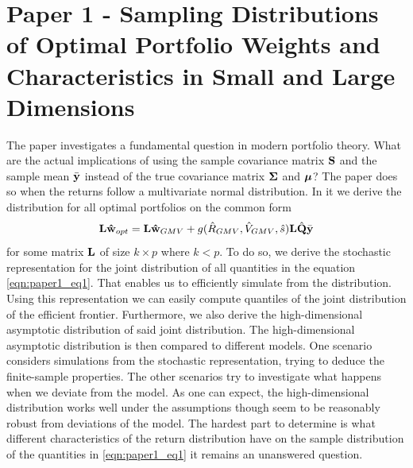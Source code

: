 \documentclass[oneside]{book}\usepackage{knitr}
\begin{document}
\section{Paper 1 - Sampling Distributions of Optimal Portfolio Weights and Characteristics in Small and Large Dimensions}\label{sec:paper1}
The paper investigates a fundamental question in modern portfolio theory. 
What are the actual implications of using the sample covariance matrix $\mathbf{S}$ and the sample mean $\bar{\mathbf{y}}$ instead of the true covariance matrix $\mathbf{\Sigma}$ and $\mbox{\boldmath$\mu$}$?
The paper does so when the returns follow a multivariate normal distribution. 
In it we derive the distribution for all optimal portfolios on the common form
\begin{equation}\label{eqn:paper1_eq1}
  \mathbf{L}\mathbf{\hat{w}}_{opt} = \mathbf{L}\mathbf{\hat{w}}_{GMV} + g(\hat{R}_{GMV}, \hat{V}_{GMV}, \hat{s})\mathbf{L}\hat{\mathbf{Q}}\bar{\mathbf{y}}
\end{equation}
for some matrix $\mathbf{L}$ of size $k \times p$ where $k<p$.
To do so, we derive the stochastic representation for the joint distribution of all quantities in the equation \eqref{eqn:paper1_eq1}. 
That enables us to efficiently simulate from the distribution.
Using this representation we can easily compute quantiles of the joint distribution of the efficient frontier.
Furthermore, we also derive the high-dimensional asymptotic distribution of said joint distribution. 
The high-dimensional asymptotic distribution is then compared to different models.
One scenario considers simulations from the stochastic representation, trying to deduce the finite-sample properties.
The other scenarios try to investigate what happens when we deviate from the model.
As one can expect, the high-dimensional distribution works well under the assumptions though seem to be reasonably robust from deviations of the model.
The hardest part to determine is what different characteristics of the return distribution have on the sample distribution of the quantities in \eqref{eqn:paper1_eq1} it remains an unanswered question.
\end{document}
